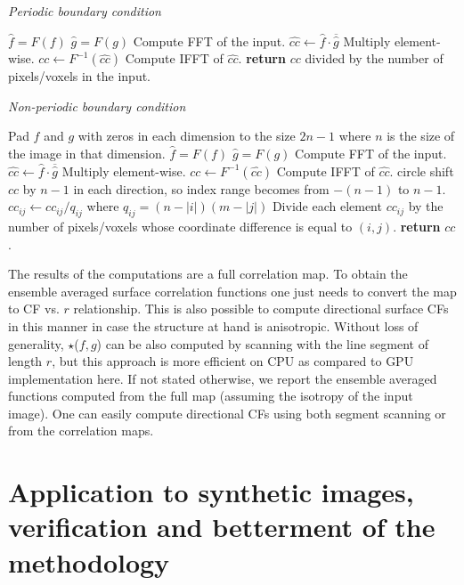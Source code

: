 \documentclass[reprint,amsmath,amssymb,aps,pre,showkeys,showpacs]{revtex4-1}
\begin{document}
\textit{Periodic boundary condition}
\begin{algorithmic}[1]
  \State $\hat{f} = F(f)$
  \State $\hat{g} = F(g)$
  \Comment Compute FFT of the input.
  \State $\hat{cc} \gets \hat{f} \cdot \overline{\hat{g}}$
  \Comment Multiply element-wise.
  \State $cc \gets F^{-1}(\hat{cc})$
  \Comment Compute IFFT of $\hat{cc}$.
  \State \textbf{return} $cc$ divided by the number of pixels/voxels in the input.
  \EndProcedure
\end{algorithmic}

\textit{Non-periodic boundary condition}
\begin{algorithmic}[1]
  \State Pad $f$ and $g$ with zeros in each dimension to the size $2n-1$ where
  $n$ is the size of the image in that dimension.
  \State $\hat{f} = F(f)$
  \State $\hat{g} = F(g)$
  \Comment Compute FFT of the input.
  \State $\hat{cc} \gets \hat{f} \cdot \overline{\hat{g}}$
  \Comment Multiply element-wise.
  \State $cc \gets F^{-1}(\hat{cc})$
  \Comment Compute IFFT of $\hat{cc}$.
  \State circle shift $cc$ by $n - 1$ in each direction, so index range becomes
  from $-(n - 1)$ to $n - 1$.
  \State $cc_{ij} \gets cc_{ij} / q_{ij}$ where $q_{ij} = (n - |i|)(m - |j|)$
  \Comment Divide each element $cc_{ij}$ by the number of pixels/voxels whose
  coordinate difference is equal to $(i, j)$.
  \State \textbf{return} $cc$.
  \EndProcedure
\end{algorithmic}

The results of the computations are a full correlation map. To obtain the
ensemble averaged surface correlation functions one just needs to convert the
map to CF vs. $r$ relationship. This is also possible to compute directional
surface CFs in this manner in case the structure at hand is anisotropic. Without
loss of generality, $\star$($f, g$) can be also computed by scanning with the
line segment of length $r$, but this approach is more efficient on CPU as
compared to GPU implementation here. If not stated otherwise, we report the
ensemble averaged functions computed from the full map (assuming the isotropy of
the input image). One can easily compute directional CFs
\cite{jiao2014chawla,EPL1} using both segment scanning or from the correlation maps.

\section{Application to synthetic images, verification and betterment of the methodology}
\label{sec:results}
\end{document}
